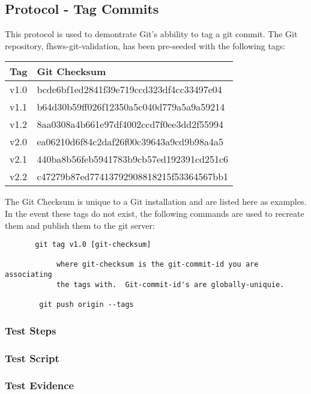 \newpage
\subsection{Protocol - Tag Commits}
This protocol is used to demontrate Git's abbility to tag a git commit.  The Git
repository, fhsws-git-validation, has been pre-seeded with the following tags:

\begin{longtable}
{|C{1.2cm}|L{10cm}|} \hline
Tag & Git Checksum\\ \hline
v1.0 & bcde6bf1ed2841f39e719ccd323df4cc33497e04 \\ \hline
v1.1 & b64d30b59ff026f12350a5c040d779a5a9a59214 \\ \hline
v1.2 & 8aa0308a4b661e97df4002ccd7f0ee3dd2f55994 \\ \hline
v2.0 & ea06210d6f84c2daf26f00c39643a9cd9b98a4a5 \\ \hline
v2.1 & 440ba8b56feb5941783b9cb57ed192391cd251c6 \\ \hline
v2.2 & c47279b87ed77413792908818215f53364567bb1 \\ \hline
\end{longtable}

The Git Checksum is unique to a Git installation and are listed here as
examples.  In the event these tags do not exist, the following commands are used
to recreate them and publish them to the git server: \\

\begin{verbatim}
       git tag v1.0 [git-checksum]

            where git-checksum is the git-commit-id you are associating
            the tags with.  Git-commit-id's are globally-uniquie.

        git push origin --tags
\end{verbatim}

\newpage
\subsubsection{Test Steps}
      {}
      {}

\newpage
\subsubsection{Test Script}


\newpage
\subsubsection{Test Evidence}
      {}
      {}
